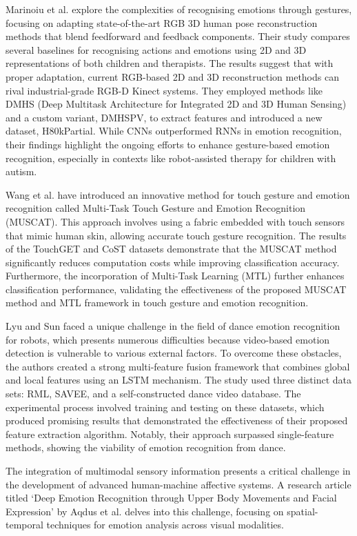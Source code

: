 Marinoiu et al. \cite{8578328} explore the complexities of recognising emotions through gestures, focusing on adapting state-of-the-art RGB 3D human pose reconstruction methods that blend feedforward and feedback components. Their study compares several baselines for recognising actions and emotions using 2D and 3D representations of both children and therapists. The results suggest that with proper adaptation, current RGB-based 2D and 3D reconstruction methods can rival industrial-grade RGB-D Kinect systems. They employed methods like DMHS (Deep Multitask Architecture for Integrated 2D and 3D Human Sensing) and a custom variant, DMHSPV, to extract features and introduced a new dataset, H80kPartial. While CNNs outperformed RNNs in emotion recognition, their findings highlight the ongoing efforts to enhance gesture-based emotion recognition, especially in contexts like robot-assisted therapy for children with autism.

Wang et al. \cite{Wang2022-eq} have introduced an innovative method for touch gesture and emotion recognition called Multi-Task Touch Gesture and Emotion Recognition (MUSCAT). This approach involves using a fabric embedded with touch sensors that mimic human skin, allowing accurate touch gesture recognition. The results of the TouchGET and CoST datasets demonstrate that the MUSCAT method significantly reduces computation costs while improving classification accuracy. Furthermore, the incorporation of Multi-Task Learning (MTL) further enhances classification performance, validating the effectiveness of the proposed MUSCAT method and MTL framework in touch gesture and emotion recognition.

Lyu and Sun \cite{Lyu2022-vd} faced a unique challenge in the field of dance emotion recognition for robots, which presents numerous difficulties because video-based emotion detection is vulnerable to various external factors. To overcome these obstacles, the authors created a strong multi-feature fusion framework that combines global and local features using an LSTM mechanism. The study used three distinct data sets: RML, SAVEE, and a self-constructed dance video database. The experimental process involved training and testing on these datasets, which produced promising results that demonstrated the effectiveness of their proposed feature extraction algorithm. Notably, their approach surpassed single-feature methods, showing the viability of emotion recognition from dance.

The integration of multimodal sensory information presents a critical challenge in the development of advanced human-machine affective systems. A research article titled `Deep Emotion Recognition through Upper Body Movements and Facial Expression' by Aqdus et al. \cite{Aqdus2021-xr} delves into this challenge, focusing on spatial-temporal techniques for emotion analysis across visual modalities.

